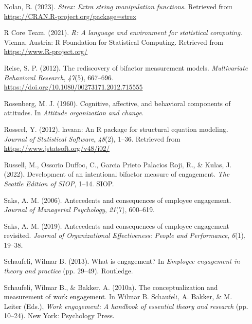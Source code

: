 \documentclass[
  man]{apa7}
\newlength{\cslhangindent}
\newlength{\cslentryspacingunit} %
\newenvironment{CSLReferences}[2] %
 {%
  \setlength{\parindent}{0pt}
  \ifodd #1
  \let\oldpar\par
  \def\par{\hangindent=\cslhangindent\oldpar}
  \fi
  \setlength{\parskip}{#2\cslentryspacingunit}
 }%
 {}
\begin{document}
\begin{CSLReferences}{1}{0}
\leavevmode{}%
Nolan, R. (2023). \emph{Strex: Extra string manipulation functions}. Retrieved from \url{https://CRAN.R-project.org/package=strex}

\leavevmode{}%
R Core Team. (2021). \emph{R: A language and environment for statistical computing}. Vienna, Austria: R Foundation for Statistical Computing. Retrieved from \url{https://www.R-project.org/}

\leavevmode{}%
Reise, S. P. (2012). The rediscovery of bifactor measurement models. \emph{Multivariate Behavioral Research}, \emph{47}(5), 667--696. \url{https://doi.org/10.1080/00273171.2012.715555}

\leavevmode{}%
Rosenberg, M. J. (1960). Cognitive, affective, and behavioral components of attitudes. In \emph{Attitude organization and change}.

\leavevmode{}%
Rosseel, Y. (2012). {lavaan}: An {R} package for structural equation modeling. \emph{Journal of Statistical Software}, \emph{48}(2), 1--36. Retrieved from \url{https://www.jstatsoft.org/v48/i02/}

\leavevmode{}%
Russell, M., Ossorio Duffoo, C., Garcia Prieto Palacios Roji, R., \& Kulas, J. (2022). Development of an intentional bifactor measure of engagement. \emph{The Seattle Edition of SIOP}, 1--14. SIOP.

\leavevmode{}%
Saks, A. M. (2006). Antecedents and consequences of employee engagement. \emph{Journal of Managerial Psychology}, \emph{21}(7), 600--619.

\leavevmode{}%
Saks, A. M. (2019). Antecedents and consequences of employee engagement revisited. \emph{Journal of Organizational Effectiveness: People and Performance}, \emph{6}(1), 19--38.

\leavevmode{}%
Schaufeli, Wilmar B. (2013). What is engagement? In \emph{Employee engagement in theory and practice} (pp. 29--49). Routledge.

\leavevmode{}%
Schaufeli, Wilmar B., \& Bakker, A. (2010a). The conceptualization and measurement of work engagement. In Wilmar B. Schaufeli, A. Bakker, \& M. Leiter (Eds.), \emph{Work engagement: A handbook of essential theory and research} (pp. 10--24). New York: Psychology Press.


\end{CSLReferences}
\end{document}
